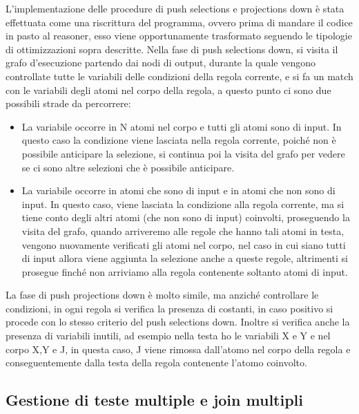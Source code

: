 L'implementazione delle procedure di push selections e projections down è stata effettuata come una riscrittura del programma, ovvero prima di mandare il codice in pasto al reasoner, esso viene opportunamente trasformato seguendo le tipologie di ottimizzazioni sopra descritte. \newline
Nella fase di push selections down, si visita il grafo d'esecuzione partendo dai nodi di output, durante la quale vengono controllate tutte le variabili delle condizioni della regola corrente, e si fa un match con le variabili degli atomi nel corpo della regola, a questo punto ci sono due possibili strade da percorrere: 
\begin{itemize}
	\item La variabile occorre in N atomi nel corpo e tutti gli atomi sono di input. In questo caso la condizione viene lasciata nella regola corrente, poiché non è possibile anticipare la selezione, si continua poi la visita del grafo per vedere se ci sono altre selezioni che è possibile anticipare.
	\item La variabile occorre in atomi che sono di input e in atomi che non sono di input. In questo caso, viene lasciata la condizione alla regola corrente, ma si tiene conto degli altri atomi (che non sono di input) coinvolti, proseguendo la visita del grafo, quando arriveremo alle regole che hanno tali atomi in testa, vengono nuovamente verificati gli atomi nel corpo, nel caso in cui siano tutti di input allora viene aggiunta la selezione anche a queste regole, altrimenti si prosegue finché non arriviamo alla regola contenente soltanto atomi di input.
\end{itemize}
La fase di push projections down è molto simile, ma anziché controllare le condizioni, in ogni regola si verifica la presenza di costanti, in caso positivo si procede con lo stesso criterio del push selections down. Inoltre si verifica anche la presenza di variabili inutili, ad esempio nella testa ho le variabili X e Y e nel corpo X,Y e J, in questa caso, J viene rimossa dall'atomo nel corpo della regola e conseguentemente dalla testa della regola contenente l'atomo coinvolto.

\subsection{Gestione di teste multiple e join multipli}

